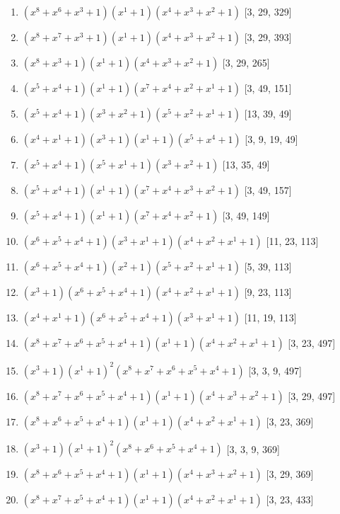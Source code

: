 \documentclass[10pt,twocolumn]{article}
\begin{document}
\begin{enumerate}
\item $(x^{8} + x^{6} + x^{3} + 1)(x^{1} + 1)(x^{4} + x^{3} + x^{2} + 1)$  [3, 29, 329]
\item $(x^{8} + x^{7} + x^{3} + 1)(x^{1} + 1)(x^{4} + x^{3} + x^{2} + 1)$  [3, 29, 393]
\item $(x^{8} + x^{3} + 1)(x^{1} + 1)(x^{4} + x^{3} + x^{2} + 1)$  [3, 29, 265]
\item $(x^{5} + x^{4} + 1)(x^{1} + 1)(x^{7} + x^{4} + x^{2} + x^{1} + 1)$  [3, 49, 151]
\item $(x^{5} + x^{4} + 1)(x^{3} + x^{2} + 1)(x^{5} + x^{2} + x^{1} + 1)$  [13, 39, 49]
\item $(x^{4} + x^{1} + 1)(x^{3} + 1)(x^{1} + 1)(x^{5} + x^{4} + 1)$  [3, 9, 19, 49]
\item $(x^{5} + x^{4} + 1)(x^{5} + x^{1} + 1)(x^{3} + x^{2} + 1)$  [13, 35, 49]
\item $(x^{5} + x^{4} + 1)(x^{1} + 1)(x^{7} + x^{4} + x^{3} + x^{2} + 1)$  [3, 49, 157]
\item $(x^{5} + x^{4} + 1)(x^{1} + 1)(x^{7} + x^{4} + x^{2} + 1)$  [3, 49, 149]
\item $(x^{6} + x^{5} + x^{4} + 1)(x^{3} + x^{1} + 1)(x^{4} + x^{2} + x^{1} + 1)$  [11, 23, 113]
\item $(x^{6} + x^{5} + x^{4} + 1)(x^{2} + 1)(x^{5} + x^{2} + x^{1} + 1)$  [5, 39, 113]
\item $(x^{3} + 1)(x^{6} + x^{5} + x^{4} + 1)(x^{4} + x^{2} + x^{1} + 1)$  [9, 23, 113]
\item $(x^{4} + x^{1} + 1)(x^{6} + x^{5} + x^{4} + 1)(x^{3} + x^{1} + 1)$  [11, 19, 113]
\item $(x^{8} + x^{7} + x^{6} + x^{5} + x^{4} + 1)(x^{1} + 1)(x^{4} + x^{2} + x^{1} + 1)$  [3, 23, 497]
\item $(x^{3} + 1)(x^{1} + 1)^{2}(x^{8} + x^{7} + x^{6} + x^{5} + x^{4} + 1)$  [3, 3, 9, 497]
\item $(x^{8} + x^{7} + x^{6} + x^{5} + x^{4} + 1)(x^{1} + 1)(x^{4} + x^{3} + x^{2} + 1)$  [3, 29, 497]
\item $(x^{8} + x^{6} + x^{5} + x^{4} + 1)(x^{1} + 1)(x^{4} + x^{2} + x^{1} + 1)$  [3, 23, 369]
\item $(x^{3} + 1)(x^{1} + 1)^{2}(x^{8} + x^{6} + x^{5} + x^{4} + 1)$  [3, 3, 9, 369]
\item $(x^{8} + x^{6} + x^{5} + x^{4} + 1)(x^{1} + 1)(x^{4} + x^{3} + x^{2} + 1)$  [3, 29, 369]
\item $(x^{8} + x^{7} + x^{5} + x^{4} + 1)(x^{1} + 1)(x^{4} + x^{2} + x^{1} + 1)$  [3, 23, 433]

\end{enumerate}
\end{document}
